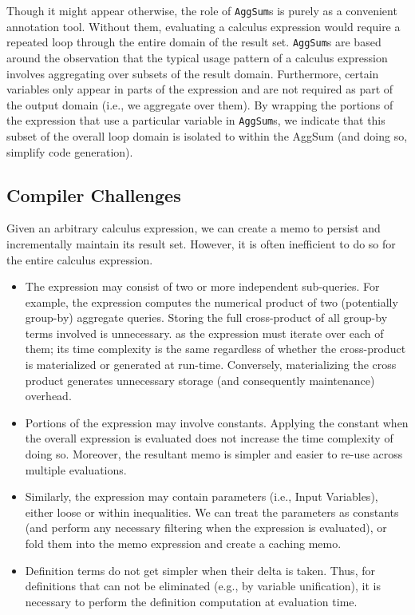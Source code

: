 \documentclass[11pt]{amsart}
\newcommand{\parsection}[1]{\smallskip\noindent{\bf #1.}}
\begin{document}
\parsection{The (ir)relevance of {\tt AggSum}s}
Though it might appear otherwise, the role of {\tt AggSum}s is purely as a convenient annotation tool.  Without them, evaluating a calculus expression would require a repeated loop through the entire domain of the result set.  {\tt AggSum}s are based around the observation that the typical usage pattern of a calculus expression involves aggregating over subsets of the result domain.  Furthermore, certain variables only appear in parts of the expression and are not required as part of the output domain (i.e., we aggregate over them).  By wrapping the portions of the expression that use a particular variable in {\tt AggSum}s, we indicate that this subset of the overall loop domain is isolated to within the {AggSum} (and doing so, simplify code generation).

\subsection{Compiler Challenges}

\parsection{Extraction}
Given an arbitrary calculus expression, we can create a memo to persist and incrementally maintain its result set.  However, it is often inefficient to do so for the entire calculus expression.  

\begin{itemize}
\item The expression may consist of two or more independent sub-queries.  For example, the expression computes the numerical product of two (potentially group-by) aggregate queries.  Storing the full cross-product of all group-by terms involved is unnecessary. as the expression must iterate over each of them; its time complexity is the same regardless of whether the cross-product is materialized or generated at run-time.  Conversely, materializing the cross product generates unnecessary storage (and consequently maintenance) overhead. 
 
\item Portions of the expression may involve constants.  Applying the constant when the overall expression is evaluated does not increase the time complexity of doing so.  Moreover, the resultant memo is simpler and easier to re-use across multiple evaluations.

\item Similarly, the expression may contain parameters (i.e., Input Variables), either loose or within inequalities.  We can treat the parameters as constants (and perform any necessary filtering when the expression is evaluated), or fold them into the memo expression and create a caching memo.

\item Definition terms do not get simpler when their delta is taken.  Thus, for definitions that can not be eliminated (e.g., by variable unification), it is necessary to perform the definition computation at evaluation time.  
\end{itemize}
\end{document}
